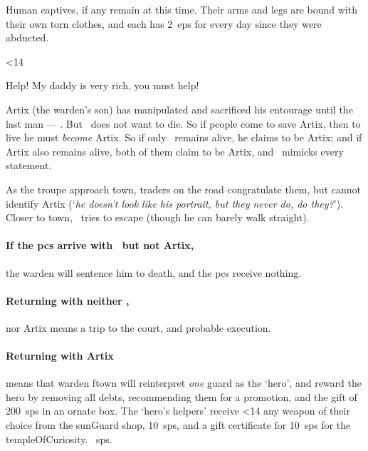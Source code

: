 \documentclass[10pt,twoside]{book}
\begin{document}
Human captives, if any remain at this time.
Their arms and legs are bound with their own torn clothes, and each has 2~\glspl{ep} for every day since they were abducted.

\ifnum\thepage<14
  \begin{speechtext}
    Help!
    My daddy is very rich, you must help!
  \end{speechtext}
\fi

Artix (the \gls{warden}'s son) has manipulated and sacrificed his entourage until the last man --- \composeHumanName.
But \currentName\ does not want to die.
So if people come to save Artix, then to live he must \emph{become} Artix.
So if only \currentName\ remains alive, he claims to be Artix; and if Artix also remains alive, both of them claim to be Artix, and \currentName\ mimicks every statement.

As the troupe approach town, traders on the road congratulate them, but cannot identify Artix (`\textit{he doesn't look like his portrait, but they never do, do they?}').
Closer to town, \currentName\ tries to escape (though he can barely walk straight).

\paragraph{If the \glspl{pc} arrive with \currentName\ but not Artix,}
the \gls{warden} will sentence him to death, and the \glspl{pc} receive nothing.

\paragraph{Returning with neither \currentName,}
nor Artix means a trip to the \gls{court}, and probable execution.%

\paragraph{Returning with Artix}
means that \Gls{warden} \gls{ftown} will reinterpret \emph{one} \gls{guard} as the `hero', and reward the hero by removing all debts, recommending them for a promotion, and the gift of 200~\glspl{sp} in an ornate box.
The `hero's helpers' receive
\ifnum\thepage<14%
  any \gls{weapon} of their choice from the \gls{sunGuard} shop, 10~\glspl{sp}, and a gift certificate for 10~\glspl{sp} for the \gls{templeOfCuriosity}.
~\glspl{sp}.
\fi%
\end{document}
